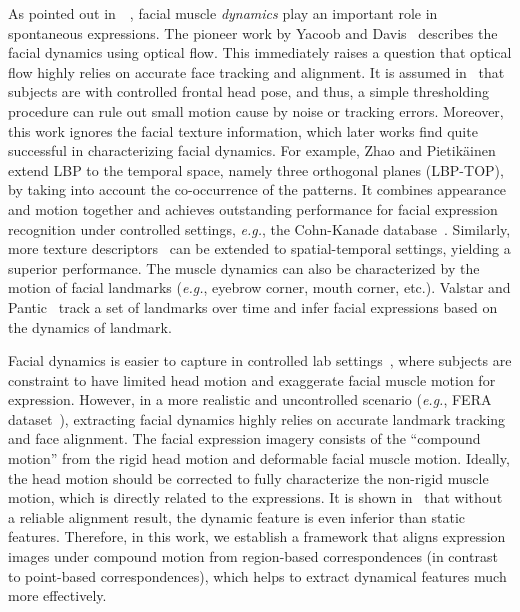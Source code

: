 \documentclass[journal]{IEEEtran}
\begin{document}
As pointed out in~\cite{Ekman2005}~\cite{Ambadar05}, facial muscle \textit{dynamics} play an important role in spontaneous expressions. The pioneer work by Yacoob and Davis~\cite{Yacoob_PAMI96} describes the facial dynamics using optical flow. This immediately raises a question that optical flow highly relies on accurate face tracking and alignment. It is assumed in~\cite{Yacoob_PAMI96} that subjects are with controlled frontal head pose, and thus, a simple thresholding procedure can rule out small motion cause by noise or tracking errors. Moreover, this work ignores the facial texture information, which later works find quite successful in characterizing facial dynamics. For example, Zhao and Pietik\"ainen~\cite{Zhao_PAMI07} extend LBP to the temporal space, namely three orthogonal planes (LBP-TOP), by taking into account the co-occurrence of the patterns. It combines appearance and motion together and achieves outstanding performance for facial expression recognition under controlled settings, \textit{e.g.}, the Cohn-Kanade database~\cite{CKplus}. Similarly, more texture descriptors~\cite{LPQ-TOP} can be extended to spatial-temporal settings, yielding a superior performance. The muscle dynamics can also be characterized by the motion of facial landmarks (\textit{e.g.}, eyebrow corner, mouth corner, etc.). Valstar and Pantic~\cite{Valstar_SMCB12} track a set of landmarks over time and infer facial expressions based on the dynamics of landmark. 

Facial dynamics is easier to capture in controlled lab settings~\cite{CKplus}, where subjects are constraint to have limited head motion and exaggerate facial muscle motion for expression. However, in a more realistic and uncontrolled scenario (\textit{e.g.}, FERA dataset~\cite{Valstar_FERA11}), extracting facial dynamics highly relies on accurate landmark tracking and face alignment. The facial expression imagery consists of the ``compound motion'' from the rigid head motion and deformable facial muscle motion. Ideally, the head motion should be corrected to fully characterize the non-rigid muscle motion, which is directly related to the expressions. It is shown in~\cite{Valstar12}\cite{Yang_SMCB12} that without a reliable alignment result, the dynamic feature is even inferior than static features. Therefore, in this work, we establish a framework that aligns expression images under compound motion from region-based correspondences (in contrast to point-based correspondences), which helps to extract dynamical features much more effectively. 
\end{document}
